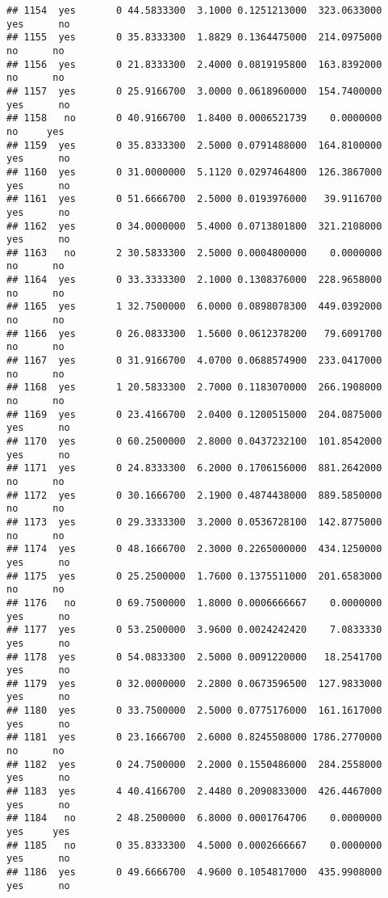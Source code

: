 \documentclass[]{article}
\begin{document}
\begin{verbatim}
## 1154  yes       0 44.5833300  3.1000 0.1251213000  323.0633000   yes      no
## 1155  yes       0 35.8333300  1.8829 0.1364475000  214.0975000    no      no
## 1156  yes       0 21.8333300  2.4000 0.0819195800  163.8392000    no      no
## 1157  yes       0 25.9166700  3.0000 0.0618960000  154.7400000   yes      no
## 1158   no       0 40.9166700  1.8400 0.0006521739    0.0000000    no     yes
## 1159  yes       0 35.8333300  2.5000 0.0791488000  164.8100000   yes      no
## 1160  yes       0 31.0000000  5.1120 0.0297464800  126.3867000   yes      no
## 1161  yes       0 51.6666700  2.5000 0.0193976000   39.9116700   yes      no
## 1162  yes       0 34.0000000  5.4000 0.0713801800  321.2108000   yes      no
## 1163   no       2 30.5833300  2.5000 0.0004800000    0.0000000    no      no
## 1164  yes       0 33.3333300  2.1000 0.1308376000  228.9658000    no      no
## 1165  yes       1 32.7500000  6.0000 0.0898078300  449.0392000    no      no
## 1166  yes       0 26.0833300  1.5600 0.0612378200   79.6091700    no      no
## 1167  yes       0 31.9166700  4.0700 0.0688574900  233.0417000    no      no
## 1168  yes       1 20.5833300  2.7000 0.1183070000  266.1908000    no      no
## 1169  yes       0 23.4166700  2.0400 0.1200515000  204.0875000   yes      no
## 1170  yes       0 60.2500000  2.8000 0.0437232100  101.8542000   yes      no
## 1171  yes       0 24.8333300  6.2000 0.1706156000  881.2642000    no      no
## 1172  yes       0 30.1666700  2.1900 0.4874438000  889.5850000    no      no
## 1173  yes       0 29.3333300  3.2000 0.0536728100  142.8775000    no      no
## 1174  yes       0 48.1666700  2.3000 0.2265000000  434.1250000   yes      no
## 1175  yes       0 25.2500000  1.7600 0.1375511000  201.6583000    no      no
## 1176   no       0 69.7500000  1.8000 0.0006666667    0.0000000   yes      no
## 1177  yes       0 53.2500000  3.9600 0.0024242420    7.0833330   yes      no
## 1178  yes       0 54.0833300  2.5000 0.0091220000   18.2541700   yes      no
## 1179  yes       0 32.0000000  2.2800 0.0673596500  127.9833000   yes      no
## 1180  yes       0 33.7500000  2.5000 0.0775176000  161.1617000   yes      no
## 1181  yes       0 23.1666700  2.6000 0.8245508000 1786.2770000    no      no
## 1182  yes       0 24.7500000  2.2000 0.1550486000  284.2558000   yes      no
## 1183  yes       4 40.4166700  2.4480 0.2090833000  426.4467000   yes      no
## 1184   no       2 48.2500000  6.8000 0.0001764706    0.0000000   yes     yes
## 1185   no       0 35.8333300  4.5000 0.0002666667    0.0000000   yes      no
## 1186  yes       0 49.6666700  4.9600 0.1054817000  435.9908000   yes      no

\end{verbatim}
\end{document}
